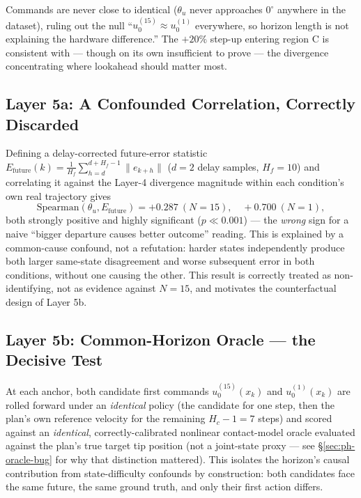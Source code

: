 \documentclass[11pt]{article}
\begin{document}
Commands are never close to identical ($\theta_u$ never approaches
$0^{\circ}$ anywhere in the dataset), ruling out the null
``$u_0^{(15)}\approx u_0^{(1)}$ everywhere, so horizon length is not
explaining the hardware difference.'' The $+20\%$ step-up entering
region C is consistent with --- though on its own insufficient to
prove --- the divergence concentrating where lookahead should matter
most.

\subsection{Layer 5a: A Confounded Correlation, Correctly Discarded}
\label{sec:ph-5a}

Defining a delay-corrected future-error statistic
$E_{\mathrm{future}}(k) = \tfrac{1}{H_f}\sum_{h=d}^{d+H_f-1}\|e_{k+h}\|$
($d{=}2$ delay samples, $H_f{=}10$) and correlating it against the
Layer-4 divergence magnitude within each condition's own real
trajectory gives
\begin{equation}
\mathrm{Spearman}(\theta_u, E_{\mathrm{future}}) = +0.287\ (N{=}15),
\quad +0.700\ (N{=}1),
\end{equation}
both strongly positive and highly significant ($p\ll 0.001$) --- the
\emph{wrong} sign for a naive ``bigger departure causes better
outcome'' reading. This is explained by a common-cause confound,
not a refutation: harder states independently produce both larger
same-state disagreement and worse subsequent error in both
conditions, without one causing the other. This result is correctly
treated as non-identifying, not as evidence against $N{=}15$, and
motivates the counterfactual design of Layer 5b.

\subsection{Layer 5b: Common-Horizon Oracle --- the Decisive Test}
\label{sec:ph-5b}

At each anchor, both candidate first commands $u_0^{(15)}(x_k)$ and
$u_0^{(1)}(x_k)$ are rolled forward under an \emph{identical} policy
(the candidate for one step, then the plan's own reference velocity
for the remaining $H_c{-}1{=}7$ steps) and scored against an
\emph{identical}, correctly-calibrated nonlinear contact-model oracle
evaluated against the plan's true target tip position (not a
joint-state proxy --- see \S\ref{sec:ph-oracle-bug} for why that
distinction mattered). This isolates the horizon's causal contribution
from state-difficulty confounds by construction: both candidates face
the same future, the same ground truth, and only their first action
differs.
\end{document}
